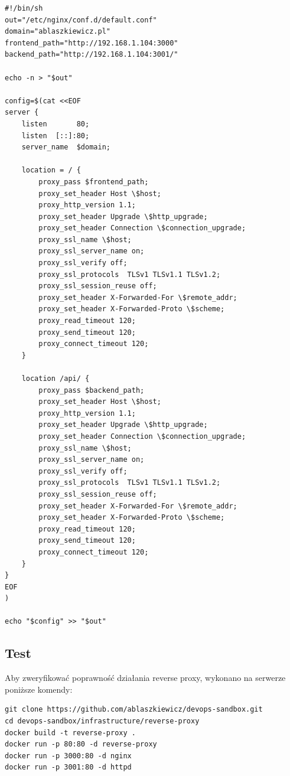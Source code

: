 \documentclass{article}
\begin{document}
\begin{lstlisting}[caption=Plik \lstinline|/infrastructure/reverse-proxy/src/nxconf.sh|]
#!/bin/sh
out="/etc/nginx/conf.d/default.conf"
domain="ablaszkiewicz.pl"
frontend_path="http://192.168.1.104:3000"
backend_path="http://192.168.1.104:3001/"

echo -n > "$out"

config=$(cat <<EOF
server {
    listen       80;
    listen  [::]:80;
    server_name  $domain;

    location = / {
        proxy_pass $frontend_path;
        proxy_set_header Host \$host;
        proxy_http_version 1.1;
        proxy_set_header Upgrade \$http_upgrade;
        proxy_set_header Connection \$connection_upgrade;
        proxy_ssl_name \$host;
        proxy_ssl_server_name on;
        proxy_ssl_verify off;
        proxy_ssl_protocols  TLSv1 TLSv1.1 TLSv1.2;
        proxy_ssl_session_reuse off;
        proxy_set_header X-Forwarded-For \$remote_addr;
        proxy_set_header X-Forwarded-Proto \$scheme;
        proxy_read_timeout 120;
        proxy_send_timeout 120;
        proxy_connect_timeout 120;
    }

    location /api/ {
        proxy_pass $backend_path;
        proxy_set_header Host \$host;
        proxy_http_version 1.1;
        proxy_set_header Upgrade \$http_upgrade;
        proxy_set_header Connection \$connection_upgrade;
        proxy_ssl_name \$host;
        proxy_ssl_server_name on;
        proxy_ssl_verify off;
        proxy_ssl_protocols  TLSv1 TLSv1.1 TLSv1.2;
        proxy_ssl_session_reuse off;
        proxy_set_header X-Forwarded-For \$remote_addr;
        proxy_set_header X-Forwarded-Proto \$scheme;
        proxy_read_timeout 120;
        proxy_send_timeout 120;
        proxy_connect_timeout 120;
    }
}
EOF
)

echo "$config" >> "$out"
\end{lstlisting}

\subsection{Test}

Aby zweryfikować poprawność działania reverse proxy, wykonano na serwerze poniższe komendy:

\begin{lstlisting}[caption=Komendy włączające reverse proxy na serwerze]
git clone https://github.com/ablaszkiewicz/devops-sandbox.git
cd devops-sandbox/infrastructure/reverse-proxy
docker build -t reverse-proxy .
docker run -p 80:80 -d reverse-proxy
docker run -p 3000:80 -d nginx
docker run -p 3001:80 -d httpd
\end{lstlisting}
\end{document}
